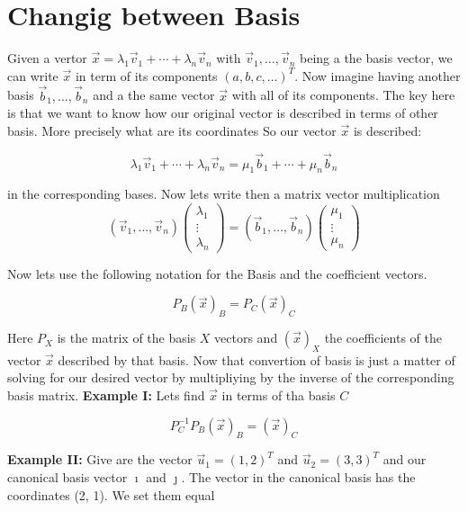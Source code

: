 \newpage
\section{Changig between Basis}

Given a vertor \(\vec{x} = \lambda_1 \vec{v}_1 + \cdots + \lambda_n \vec{v}_n\) 
with \(\vec{v}_1, \dots, \vec{v}_n\)
being a the basis vector, we can write \(\vec{x}\) in term of its components \((a, b, c, \dots)^T\).
\newline
Now imagine having another basis \(\vec{b}_1, \dots, \vec{b}_n\) and a the same vector \(\vec{x}\)
with all of its components. The key here is that we want to know how our original
vector is described in terms of other basis. More precisely what are its coordinates
\newline
So our vector \(\vec{x}\) is described:

\[\lambda_1 \vec{v}_1 + \cdots + \lambda_n \vec{v}_n = \mu_1 \vec{b}_1 + \cdots + \mu_n \vec{b}_n\]

in the corresponding bases.
\newline
Now lets write then a matrix vector multiplication
\[
(\vec{v}_1, \dots, \vec{v}_ n) 
\begin{pmatrix} \lambda_1 \\ \vdots \\ \lambda_n \end{pmatrix}
 =
(\vec{b}_1, \dots, \vec{b}_ n) 
\begin{pmatrix} \mu_1 \\ \vdots \\ \mu_n \end{pmatrix}
\]

Now lets use the following notation for the Basis and the coefficient vectors.

\[P_B (\vec{x})_B = P_C (\vec{x})_C\]

Here \(P_{X}\) is the matrix of the basis \(X\) vectors and \((\vec{x})_X\) the coefficients of the
vector \(\vec{x}\) described by that basis.
\newline
Now that convertion of basis is just a matter of solving for 
our desired vector by multipliying
by the inverse of the corresponding basis matrix.
\newline
\textbf{Example I:}
\newline
Lets find \(\vec{x}\) in terms of tha basis \(C\)

\[P_{C}^{-1} P_B (\vec{x})_B = (\vec{x})_C\]

\textbf{Example II:}
\newline
Give are the vector \(\vec{u}_1 = (1,2)^T\) and \(\vec{u}_2 = (3, 3)^T\)
and our canonical basis vector \(\imath\) and \(\jmath\). The
vector in the canonical basis has the coordinates (2, 1). 
\newline
We set them equal

